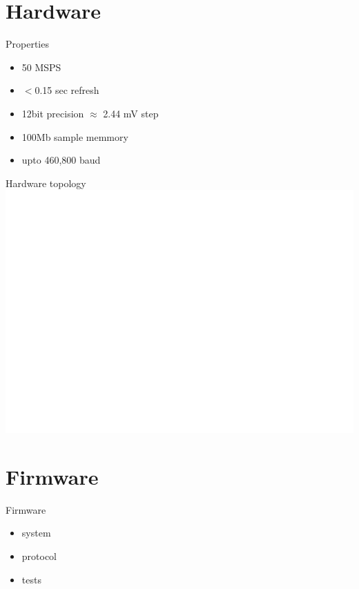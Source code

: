 \documentclass{beamer}
\begin{document}
\section{Hardware}


%	

	\begin{frame}{Properties}
		\begin{itemize}
			\item 50 MSPS
			\item $<$0.15 sec refresh
			\item 12bit precision $\approx$ 2.44 mV step
			\item 100Mb sample memmory
			\item upto 460,800 baud
		\end{itemize}
	\end{frame}	

	\begin{frame}{Hardware topology}
		\includegraphics[width=0.9\paperwidth]{Topology.png}
	\end{frame}


\section{Firmware}

	\begin{frame}{Firmware}
		\begin{itemize}
			\item system
			\item protocol
			\item tests
		\end{itemize}
	\end{frame}
\end{document}
